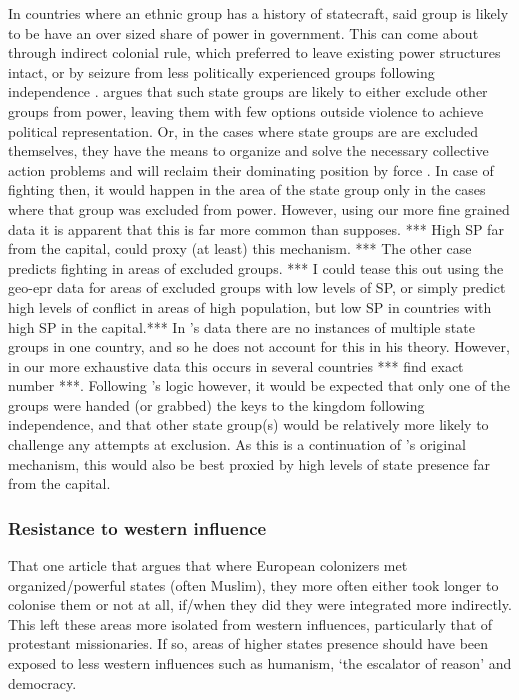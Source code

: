 \documentclass[12pt]{article}
\begin{document}
In countries where an ethnic group has a history of statecraft, said group is
likely to be have an over sized share of power in government. This can come
about through indirect colonial rule, which preferred to leave existing power
structures intact, or by seizure from less politically experienced groups
following independence \citep{Paine2019}. \citet{Paine2019} argues that such
state groups are likely to either exclude other groups from power, leaving them
with few options outside violence to achieve political representation. Or, in
the cases where state groups are are excluded themselves, they have the means to
organize and solve the necessary collective action problems and will reclaim
their dominating position by force \citep{Paine2019}. In case of fighting then,
it would happen in the area of the state group only in the cases where that
group was excluded from power. However, using our more fine grained data it is
apparent that this is far more common than \citet{Paine2019} supposes. *** High
SP far from the capital, could proxy (at least) this mechanism. *** The other
case predicts fighting in areas of excluded groups. *** I could tease this out
using the geo-epr data for areas of excluded groups with low levels of SP, or
simply predict high levels of conflict in areas of high population, but low SP
in countries with high SP in the capital.*** In \citet{Paine2019}'s data there
are no instances of multiple state groups in one country, and so he does not
account for this in his theory. However, in our more exhaustive data this occurs
in several countries *** find exact number ***. Following \citet{Paine2019}'s
logic however, it would be expected that only one of the groups were handed (or
grabbed) the keys to the kingdom following independence, and that other state
group(s) would be relatively more likely to challenge any attempts at exclusion.
As this is a continuation of \citet{Paine2019}'s original mechanism, this would
also be best proxied by high levels of state presence far from the capital.

\subsubsection{Resistance to western influence}

That one article that argues that where European colonizers met
organized/powerful states (often Muslim), they more often either took longer to
colonise them or not at all, if/when they did they were integrated more
indirectly. This left these areas more isolated from western influences,
particularly that of protestant missionaries. If so, areas of higher states
presence should have been exposed to less western influences such as humanism,
`the escalator of reason' \citep{Pinker2012} and democracy.
\end{document}
